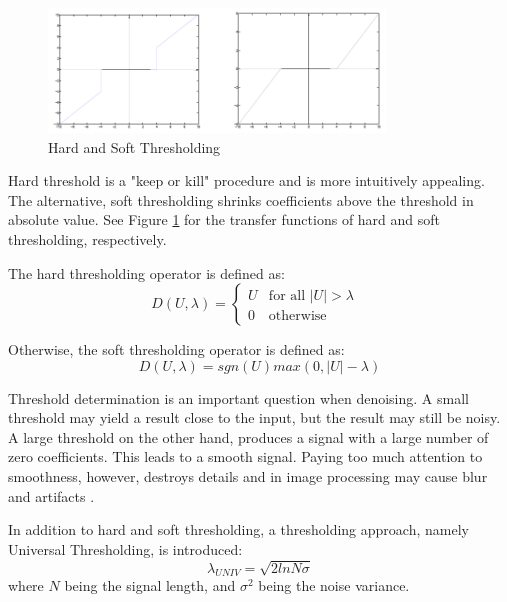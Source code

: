 \begin{figure}[h]
	\centering
	\includegraphics[width=0.8\textwidth]{fig/hard_soft_thresholding}
	\caption{Hard and Soft Thresholding}
	\label{fig:hard_soft_thresholding}
\end{figure}

Hard threshold is a "keep or kill" procedure and
is more intuitively appealing. The alternative, soft
thresholding shrinks coefficients above the threshold in absolute value. See Figure \ref{fig:hard_soft_thresholding} for the transfer functions of hard and soft thresholding, respectively. 

The hard thresholding operator is defined as:
\begin{equation}
D(U, \lambda) = 
\begin{cases}
U &\text{for all $|U|>\lambda$ }\\
0 &\text{otherwise}
\end{cases}	
\end{equation}

Otherwise, the soft thresholding operator is defined as:
\begin{equation}
D(U, \lambda) = sgn(U)max(0, |U| - \lambda)
\end{equation}

Threshold determination is an important question when denoising. A small threshold
may yield a result close to the input, but the
result may still be noisy. A large threshold on the other hand, produces a signal with a large number
of zero coefficients. This leads to a smooth signal.
Paying too much attention to smoothness, however,
destroys details and in image processing may cause
blur and artifacts \cite{rangarajan2002image}.

In addition to hard and soft thresholding, a thresholding approach, namely Universal Thresholding, is introduced:
\begin{equation}
\lambda_{UNIV}=\sqrt{2lnN\sigma}
\end{equation}
where $N$ being the signal length, and $\sigma^2$ being the noise variance.

